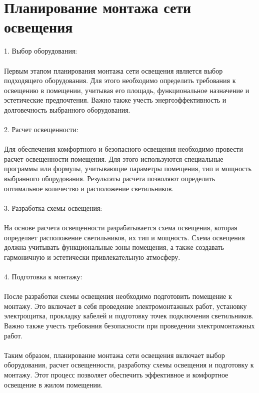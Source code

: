 \documentclass{article}
\begin{document}
\section{Планирование монтажа сети освещения}
1. Выбор оборудования:\\
~\\
Первым этапом планирования монтажа сети освещения является выбор подходящего оборудования. Для этого необходимо определить требования к освещению в помещении, учитывая его площадь, функциональное назначение и эстетические предпочтения. Важно также учесть энергоэффективность и долговечность выбранного оборудования.\\
~\\
2. Расчет освещенности:\\
~\\
Для обеспечения комфортного и безопасного освещения необходимо провести расчет освещенности помещения. Для этого используются специальные программы или формулы, учитывающие параметры помещения, тип и мощность выбранного оборудования. Результаты расчета позволяют определить оптимальное количество и расположение светильников.\\
~\\
3. Разработка схемы освещения:\\
~\\
На основе расчета освещенности разрабатывается схема освещения, которая определяет расположение светильников, их тип и мощность. Схема освещения должна учитывать функциональные зоны помещения, а также создавать гармоничную и эстетически привлекательную атмосферу.\\
~\\
4. Подготовка к монтажу:\\
~\\
После разработки схемы освещения необходимо подготовить помещение к монтажу. Это включает в себя проведение электромонтажных работ, установку электрощитка, прокладку кабелей и подготовку точек подключения светильников. Важно также учесть требования безопасности при проведении электромонтажных работ.\\
~\\
Таким образом, планирование монтажа сети освещения включает выбор оборудования, расчет освещенности, разработку схемы освещения и подготовку к монтажу. Этот процесс позволяет обеспечить эффективное и комфортное освещение в жилом помещении.
\end{document}

